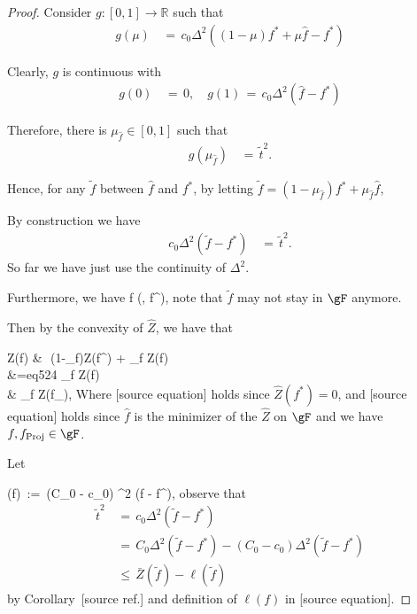 \documentclass[twoside,11pt]{article}
\makeatletter
\newcommand{\discardlabel}[1]{}
\newcommand{\discardtwo}[2]{}
\newcommand{\legacyref}[1]{\textup{[source ref.]}}
\newcommand{\legacyeqref}[1]{\textup{[source equation]}}
\newenvironment{legacycomparison}{%
  \begingroup\color{legacygray}%
  \let\label\discardlabel
  \let\originallabel\discardlabel
  \let\ref\legacyref
  \let\pageref\legacyref
  \let\eqref\legacyeqref
  \let\cref\legacyref
  \let\Cref\legacyref
  \let\autoref\legacyref
  \let\aliasref\discardtwo
}{\endgroup}
\newcommand{\aliasref}[2]{%
  \@ifundefined{r@#2}{}{%
    \expandafter\let\csname r@#1\expandafter\endcsname\csname r@#2\endcsname}}
\makeatother
\begin{document}
\begin{legacycomparison}
\begin{proof}
Consider $g: [0,1] \rightarrow \mathbb{R}$ such that
\begin{align*}
g(\mu) &\,=\, c_0\Delta^2 ((1-\mu)f^\ast + \mu\hat f - f^\ast)
\end{align*}

Clearly, $g$ is continuous with
\begin{align*}
g(0) &\,=\, 0, \quad g(1) \,=\, c_0\Delta^2(\hat f - f^\ast)
\end{align*}

Therefore, there is $\mu_{\hat f} \in [0,1]$ such that
\begin{align*}
g(\mu_{\hat f}) &\,=\, \tilde t^2.
\end{align*}

Hence, for any $\tilde f$ between $\hat f$ and $f^\ast$, by letting $\tilde f = (1-\mu_{\hat f})f^\ast + \mu_{\hat f} \hat f$, 

By construction we have
\begin{align*}
c_0 \Delta^2(\tilde f - f^\ast) &\,=\, \tilde t^2. 
\end{align*} So far we have just use the continuity of $\Delta^2$. 

Furthermore, we have 
\bea 
\tilde f \in {}(\gF, f^\ast), 
\bea note that $\tilde f$ may not stay in $\gF$ anymore. 

Then by the convexity of $\hat Z$, we have that
\beq 
\label{eq:star}
\hat Z(\tilde f) &\,\leq\, (1-\mu_{\hat f})\hat Z(f^\ast) + \mu_{\hat f} \hat Z(\hat f)  \\
&={eq524} \mu_{\hat f} \hat Z(\hat f) \\ &  \mu_{\hat f} \hat Z(f_{}), 
\beq 
Where \eqref{eq524} holds since $\hat Z(f^\ast)=0$, and \eqref{iq525} holds since $\hat f$ is the minimizer of the $\hat Z$ on $\gF$ and we have $f, f_{\text{Proj}} \in \gF$.

Let 
\beq
\label{def_tilde_l}
\ell(\tilde f) \,:=\, (C_0 - c_0) \Delta^2 (\tilde f - f^\ast),
\beq observe that
\begin{align*}
\tilde t^2 &\,=\, c_0 \Delta^2 (\tilde f - f^\ast) \\
&\,=\, C_0 \Delta^2 (\tilde f - f^\ast) - (C_0 - c_0)\Delta^2 (\tilde f - f^\ast) \\
&\,\leq\, \bar Z(\tilde f) - \ell(\tilde f)
\end{align*}
by Corollary~\ref{extension of lemma13} and definition of $\ell(f)$ in \eqref{def_tilde_l}. 


\end{proof}
\end{legacycomparison}
\end{document}
